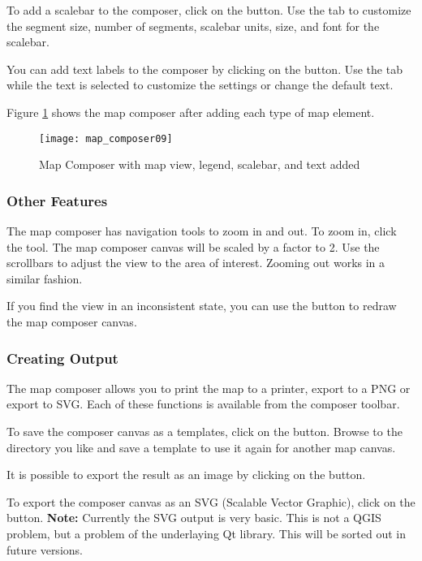 To add a scalebar to the composer, click on the
 button. Use the 
tab to customize the segment size, number of segments, scalebar units, size,
and font for the scalebar.

You can add text labels to the composer by clicking on the
 button. Use the  tab
while the text is selected to customize the settings or change the default text.

Figure \ref{fig:map_composer_complete} shows the map composer after adding
each type of map element.
\begin{figure}[h]
   \begin{center}
   \caption{Map Composer with map view, legend, scalebar, and text added}\label{fig:map_composer_complete}\smallskip
   \texttt{[image: map\_composer09]}
\end{center}  
\end{figure}

\subsubsection{Other Features}

The map composer has navigation tools to zoom in and out. To zoom in, click
the  tool. The map composer canvas will be scaled by a factor to 2. Use
the scrollbars to adjust the view to the area of interest. Zooming out works
in a similar fashion.

If you find the view in an inconsistent state, you can use the  button
to redraw the map composer canvas.

\subsubsection{Creating Output}

The map composer allows you to print the map to a printer, export to a PNG or
export to SVG. Each of these functions is available from the composer toolbar.

To save the composer canvas as a templates, click on the
 button. Browse to the directory 
you like and save a template to use it again for another map canvas.

It is possible to export the result as an image by clicking on the
 button. 

To export the composer canvas as an  SVG (Scalable Vector Graphic), click on
the  button. \textbf{Note:}
Currently the SVG output is very basic. This is not a QGIS problem, but a
problem of the underlaying Qt library. This will be sorted out in future versions.
 
